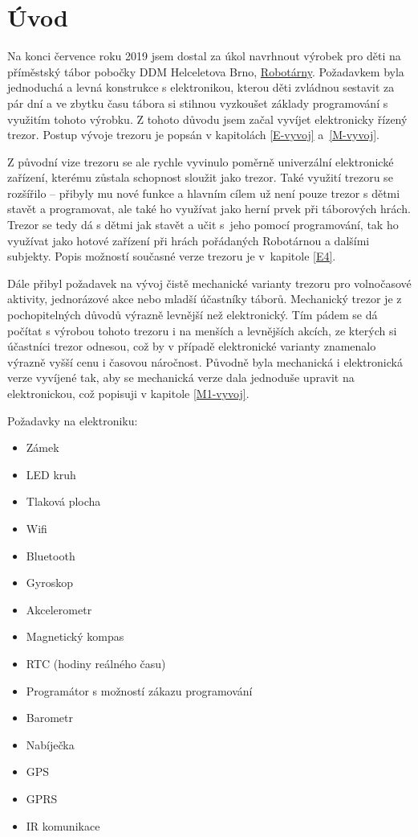 \chapter{Úvod}

Na konci července roku 2019 jsem dostal za úkol navrhnout výrobek pro děti na příměstský tábor pobočky DDM Helceletova Brno, \href{https://helceletka.cz/robotarna/}{Robotárny}.
Poža\-dav\-kem byla jednoduchá a levná konstrukce s elektronikou, kterou děti zvládnou sestavit za pár dní a ve zbytku času tábora si stihnou vyzkoušet základy programování 
s využitím tohoto výrobku. Z tohoto důvodu jsem začal vyvíjet elektronicky řízený trezor. Postup vývoje trezoru je popsán v kapitolách \ref{E-vyvoj} a~\ref{M-vyvoj}.

Z původní vize trezoru se ale rychle vyvinulo poměrně univerzální elektronické zařízení, kterému zůstala schopnost sloužit jako trezor.
Také využití trezoru se rozšířilo -- přibyly mu nové funkce a hlavním cílem už není pouze trezor  s dětmi stavět a programovat, 
ale také ho využívat jako herní prvek při táborových hrách. 
Trezor se tedy dá s dětmi jak stavět a učit s~jeho pomocí programování, tak ho využívat jako hotové zařízení při hrách pořádaných Robotárnou a dalšími subjekty.
Popis možností současné verze trezoru je v~kapitole \ref{E4}.

Dále přibyl požadavek na vývoj čistě mechanické varianty trezoru pro volnočasové aktivity, jednorázové akce nebo mladší účastníky táborů.
Mechanický trezor je z pochopitelných důvodů výrazně levnější než elektronický. Tím pádem se dá počítat s výrobou tohoto trezoru i na menších a levnějších akcích, ze kterých 
si účastníci trezor odnesou, což by v případě elektronické varianty znamenalo výrazně vyšší cenu i časovou náročnost.
Původně byla mechanická i elektronická verze vyvíjené tak, aby se mechanická verze dala jednoduše upravit na elektronickou, což popisuji v kapitole \ref{M1-vyvoj}.

Požadavky na elektroniku:
\begin{itemize}
    \item Zámek
    \item LED kruh
    \item Tlaková plocha
    \item Wifi
    \item Bluetooth
    \item Gyroskop
    \item Akcelerometr
    \item Magnetický kompas
    \item RTC (hodiny reálného času)
    \item Programátor s možností zákazu programování
    \item Barometr
    \item Nabíječka
    \item GPS
    \item GPRS
    \item IR komunikace
\end{itemize}

